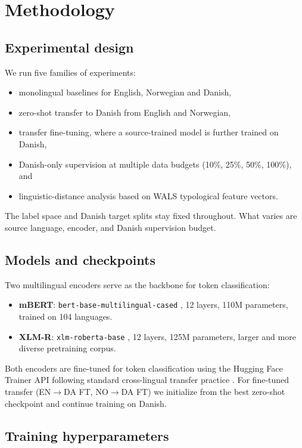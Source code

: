 \section{Methodology}

\subsection{Experimental design}

We run five families of experiments:
\begin{itemize}
  \item monolingual baselines for English, Norwegian and Danish,
  \item zero-shot transfer to Danish from English and Norwegian,
  \item transfer fine-tuning, where a source-trained model is further trained on Danish,
  \item Danish-only supervision at multiple data budgets (10\%, 25\%, 50\%, 100\%), and
  \item linguistic-distance analysis based on WALS typological feature vectors.
\end{itemize}

The label space and Danish target splits stay fixed throughout. What varies are source language, encoder, and Danish supervision budget.

\subsection{Models and checkpoints}

Two multilingual encoders serve as the backbone for token classification:
\begin{itemize}
  \item \textbf{mBERT}: \texttt{bert-base-multilingual-cased} \citep{devlin2019bert}, 12 layers, 110M parameters, trained on 104 languages.
  \item \textbf{XLM-R}: \texttt{xlm-roberta-base} \citep{conneau2020xlmr}, 12 layers, 125M parameters, larger and more diverse pretraining corpus.
\end{itemize}

Both encoders are fine-tuned for token classification using the Hugging Face Trainer API following standard cross-lingual transfer practice \citep{kdnuggets2023mbert}. For fine-tuned transfer (EN$\rightarrow$DA FT, NO$\rightarrow$DA FT) we initialize from the best zero-shot checkpoint and continue training on Danish.

\subsection{Training hyperparameters}

